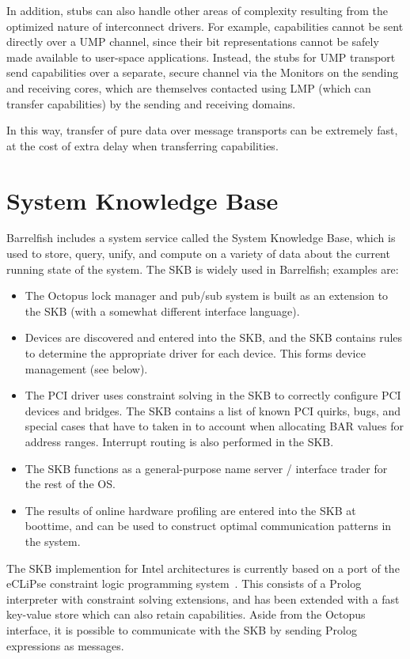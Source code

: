 \documentclass[a4paper,twoside]{report} %
\begin{document}
In addition, stubs can also handle other areas of complexity resulting
from the optimized nature of interconnect drivers.  For example,
capabilities cannot be sent directly over a UMP channel, since their
bit representations cannot be safely made available to user-space
applications.  Instead, the stubs for UMP transport send capabilities
over a separate, secure channel via the Monitors on the sending and
receiving cores, which are themselves contacted using LMP (which can
transfer capabilities) by the sending and receiving domains.  

In this way, transfer of pure data over message transports can be
extremely fast, at the cost of extra delay when transferring
capabilities. 

\section{System Knowledge Base}

Barrelfish includes a system service called the System Knowledge Base,
which is used to store, query, unify, and compute on a variety of data
about the current running state of the system.  The SKB is widely used
in Barrelfish; examples are:

\begin{itemize}
\item The Octopus lock manager and pub/sub system is built as an
  extension to the SKB (with a somewhat different interface
  language). 
\item Devices are discovered and entered into the SKB, and the SKB
  contains rules to determine the appropriate driver for each device.
  This forms device management (see below).
\item The PCI driver uses constraint solving in the SKB to correctly
  configure PCI devices and bridges.  The SKB contains a list of known
  PCI quirks, bugs, and special cases that have to taken in to account
  when allocating BAR values for address ranges.  Interrupt routing is
  also performed in the SKB.
\item The SKB functions as a general-purpose name server / interface
  trader for the rest of the OS.
\item The results of online hardware profiling are entered into the
  SKB at boottime, and can be used to construct optimal communication
  patterns in the system.
\end{itemize}

The SKB implemention for Intel architectures is currently based on a
port of the eCLiPse constraint logic programming
system~\cite{eclipse}.  This consists of a Prolog interpreter with
constraint solving extensions, and has been extended with a fast
key-value store which can also retain capabilities.  Aside from the
Octopus interface, it is possible to communicate with the SKB by
sending Prolog expressions as messages.
\end{document}
